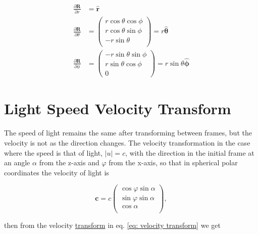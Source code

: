 \begin{equation}
	\begin{aligned}
		\frac{\partial\mathbf{R}}{\partial r}      & = \mathbf{\hat{\text{$r$}}} \\
		\frac{\partial\mathbf{R}}{\partial \theta} & =
		\begin{pmatrix}
			r \cos\theta \cos\phi \\
			r \cos\theta \sin\phi \\
			-r \sin\theta         \\
		\end{pmatrix}
		=r\mathbf{\hat{\text{$\theta$}}}                                         \\
		\frac{\partial\mathbf{R}}{\partial \phi}   & =
		\begin{pmatrix}
			-r \sin\theta \sin\phi \\
			r \sin\theta \cos\phi  \\
			0
		\end{pmatrix}
		= r \sin\theta \mathbf{\hat{\text{$\phi$}}}
	\end{aligned}
\end{equation}

\section{Light Speed Velocity Transform}

The speed of light remains the same after transforming between frames, but the velocity is not as the direction changes. The velocity transformation in the case where the speed is that of light, $|u|=c$, with the direction in the initial frame at an angle $\alpha$ from the z-axis and $\varphi$ from the x-axis, so that in spherical polar coordinates the velocity of light is

\begin{equation}
	\mathbf{c} = c
	\begin{pmatrix}
		\cos{\varphi}\sin{\alpha} \\
		\sin{\varphi}\sin{\alpha} \\
		\cos{\alpha}              \\
	\end{pmatrix},
\end{equation}

then from the velocity \hyperlink{def-transform}{transform} in eq. \eqref{eq: velocity transform} we get

